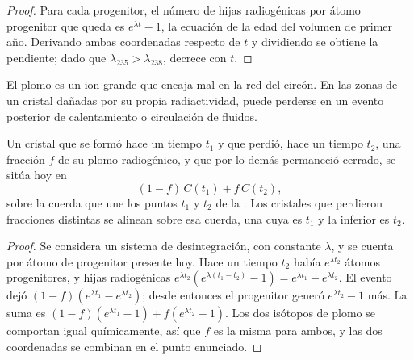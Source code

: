 \begin{proof}
Para cada progenitor, el número de hijas radiogénicas por átomo progenitor que queda es
$e^{\lambda t} - 1$, la ecuación de la edad del volumen de primer año. Derivando
ambas coordenadas respecto de $t$ y dividiendo se obtiene la pendiente; dado que
$\lambda_{235} > \lambda_{238}$, decrece con $t$.
\end{proof}

El plomo es un ion grande que encaja mal en la red del circón. En las zonas de un
cristal dañadas por su propia radiactividad, puede perderse en un evento posterior de
calentamiento o circulación de fluidos.

\begin{theorem}\label{thm:b3:advanced-geochronology:discordia}
Un cristal que se formó hace un tiempo $t_1$ y que perdió, hace un tiempo $t_2$, una fracción $f$
de su plomo radiogénico, y que por lo demás permaneció cerrado, se sitúa hoy en
\[
(1 - f)\,C(t_1) + f\,C(t_2),
\]
sobre la cuerda que une los puntos $t_1$ y $t_2$ de la . Los cristales que
perdieron fracciones distintas se alinean sobre esa cuerda, una  cuya
 es $t_1$ y la inferior es $t_2$.
\end{theorem}

\begin{proof}
Se considera un sistema de desintegración, con constante $\lambda$, y se cuenta por átomo de progenitor
presente hoy. Hace un tiempo $t_2$ había $e^{\lambda t_2}$ átomos progenitores, y
hijas radiogénicas $e^{\lambda t_2}(e^{\lambda(t_1 - t_2)} - 1) =
e^{\lambda t_1} - e^{\lambda t_2}$. El evento dejó $(1 - f)(e^{\lambda t_1} -
e^{\lambda t_2})$; desde entonces el progenitor generó $e^{\lambda t_2} - 1$ más. La
suma es $(1 - f)(e^{\lambda t_1} - 1) + f(e^{\lambda t_2} - 1)$. Los dos isótopos
de plomo se comportan igual químicamente, así que $f$ es la misma para ambos, y las dos
coordenadas se combinan en el punto enunciado.
\end{proof}

